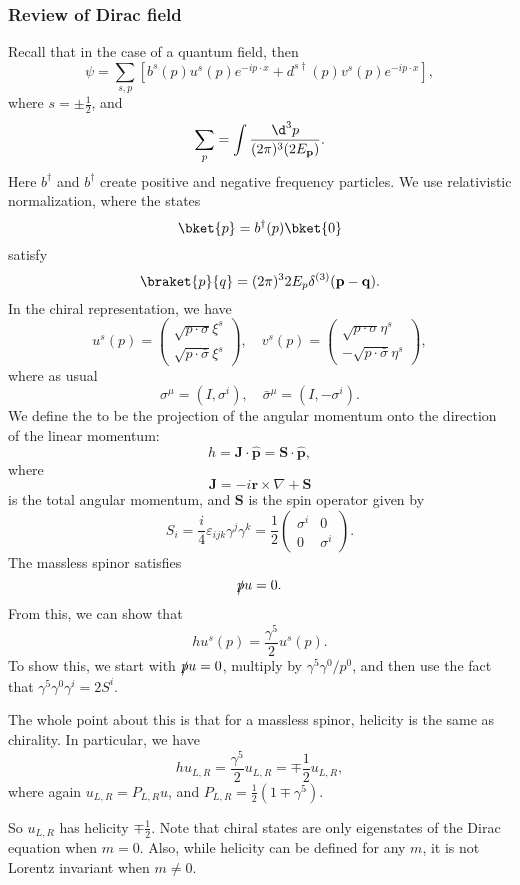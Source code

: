 \documentclass[a4paper]{article}
\begin{document}
\subsubsection*{Review of Dirac field}
Recall that in the case of a quantum field, then
\[
  \psi = \sum_{s, p}\left[b^s (p) u^s(p) e^{-ip\cdot x} + d^{s\dagger}(p) v^s(p) e^{-ip\cdot x}\right],
\]
where $s = \pm \frac{1}{2}$, and
\[
  \sum_p = \int \frac{\d^3 p}{(2\pi)^3 (2E_\mathbf{p})}.
\]
Here $b^\dagger$ and $b^\dagger$ create positive and negative frequency particles. We use relativistic normalization, where the states
\[
  \bket{p} = b^\dagger(p) \bket{0}
\]
satisfy
\[
  \braket{p}{q} = (2\pi)^3 2E_p \delta^{(3)} (\mathbf{p} - \mathbf{q}).
\]
In the chiral representation, we have
\[
  u^s(p) =
  \begin{pmatrix}
    \sqrt{p \cdot \sigma} \xi^s\\
    \sqrt{p \cdot \bar\sigma} \xi^s
  \end{pmatrix},\quad
  v^s(p) =
  \begin{pmatrix}
    \sqrt{p \cdot \sigma} \eta^s\\
    -\sqrt{p \cdot \bar\sigma} \eta^s
  \end{pmatrix},
\]
where as usual
\[
  \sigma^\mu = (I, \sigma^i),\quad \bar{\sigma}^\mu = (I, - \sigma^i).
\]
We define the  to be the projection of the angular momentum onto the direction of the linear momentum:
\[
  h = \mathbf{J} \cdot \hat{\mathbf{p}} = \mathbf{S} \cdot \hat{\mathbf{p}},
\]
where
\[
  \mathbf{J} = -i \mathbf{r} \times \nabla + \mathbf{S}
\]
is the total angular momentum, and $\mathbf{S}$ is the spin operator given by
\[
  S_i = \frac{i}{4} \varepsilon_{ijk} \gamma^j \gamma^k = \frac{1}{2}
  \begin{pmatrix}
    \sigma^i & 0\\
    0 & \sigma^i
  \end{pmatrix}.
\]
The massless spinor satisfies
\[
  \slashed{p}u = 0.
\]
From this, we can show that
\[
  hu^{s}(p) = \frac{\gamma^5}{2} u^s(p).
\]
To show this, we start with $\slashed p u = 0$, multiply by $\gamma^5 \gamma^0/p^0$, and then use the fact that $\gamma^5 \gamma^0 \gamma^i = 2 S^i$.

The whole point about this is that for a massless spinor, helicity is the same as chirality. In particular, we have
\[
  h u_{L, R} = \frac{\gamma^5}{2} u_{L, R} = \mp \frac{1}{2} u_{L, R},
\]
where again $u_{L, R} = P_{L, R} u$, and $P_{L, R} = \frac{1}{2} (1 \mp \gamma^5)$.

So $u_{L, R}$ has helicity $\mp\frac{1}{2}$. Note that chiral states are only eigenstates of the Dirac equation when $m = 0$. Also, while helicity can be defined for any $m$, it is not Lorentz invariant when $m \not= 0$.
\end{document}
